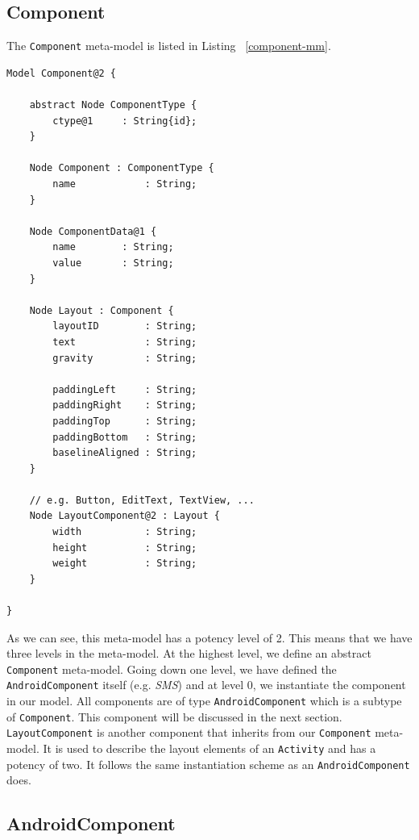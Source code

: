 \subsection{Component}

The \texttt{Component} meta-model is listed in Listing ~\ref{component-mm}.

\begin{lstlisting}[label=component-mm,caption=Component meta-model, captionpos=t]
Model Component@2 {
	
	abstract Node ComponentType {
		ctype@1		: String{id};
	}

	Node Component : ComponentType {
		name			: String;
	}

	Node ComponentData@1 {
		name 		: String;
		value 		: String;
	}
	
	Node Layout : Component {
		layoutID		: String;
		text 			: String;
		gravity			: String;

		paddingLeft 	: String;
		paddingRight	: String;
		paddingTop 		: String;
		paddingBottom 	: String;
		baselineAligned : String;
	}

	// e.g. Button, EditText, TextView, ...
	Node LayoutComponent@2 : Layout {
		width			: String;
		height			: String;
		weight			: String;
	}

}
\end{lstlisting}
As we can see, this meta-model has a potency level of 2. This means that we have three levels in the meta-model. At the highest level, we define an abstract \texttt{Component} meta-model. Going down one level, we have defined the \texttt{AndroidComponent} itself (e.g. \textit{SMS}) and at level 0, we instantiate the component in our model. All components are of type \texttt{AndroidComponent} which is a subtype of \texttt{Component}. This component will be discussed in the next section. \texttt{LayoutComponent} is another component that inherits from our \texttt{Component} meta-model. It is used to describe the layout elements of an \texttt{Activity} and has a potency of two. It follows the same instantiation scheme as an \texttt{AndroidComponent} does.

\subsection{AndroidComponent}

